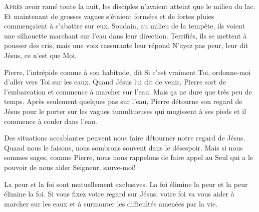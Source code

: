 


\lettrine{A}{près} avoir ramé toute la nuit,
 les disciples n'avaient atteint que le milieu du lac.
 Et maintenant de grosses vagues s'étaient formées et de fortes pluies
 commen\c{c}aient à s'abattre sur eux. Soudain, au milieu de la tempête,
 ils voient une silhouette marchant sur l'eau dans leur direction.
 Terrifiés, ils se mettent à pousser des cris,
 mais une voix rassurante leur répond\frcolon{}
 \Og N'ayez pas peur, leur dit Jésus, ce n'est que Moi. \Fg{}


Pierre, l'intrépide  comme à son habitude, dit\frcolon{} 
 \Og Si c'est vraiment Toi, ordonne-moi d'aller vers Toi sur les eaux. \Fg{}
 Quand Jésus lui dit de venir, Pierre sort de l'embarcation et commence
 à marcher sur l'eau. Mais \c{c}a ne dure que très peu de temps.
 Après seulement quelques pas sur l'eau, Pierre détourne son  regard
 de Jésus pour le porter sur les vagues tumultueuses qui mugissent à ses pieds
 et il commence à couler dans l'eau.

Des situations accablantes peuvent nous faire détourner notre regard de Jésus.
 Quand nous le faisons, nous sombrons souvent dans le désespoir.
 Mais si nous sommes sages, comme Pierre, nous nous rappelons
 de faire appel au Seul qui a le pouvoir de nous aider\frcolon{}
 \Og Seigneur, sauve-moi! \Fg{}

La peur et la foi sont mutuellement exclusives. La foi élimine la peur
 et la peur élimine la foi. Si vous fixez votre regard sur Jésus,
 votre foi va vous aider à marcher sur les eaux et à surmonter
 les difficultés amenées par la vie. 

\dvrule



